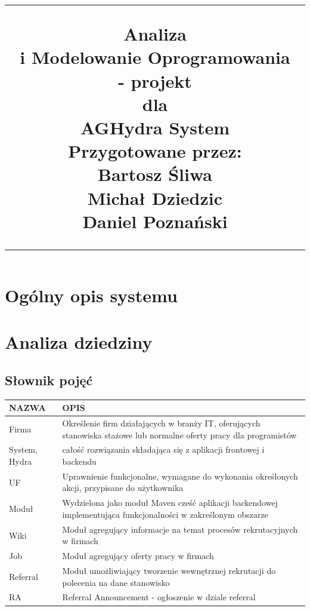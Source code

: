 \documentclass{scrreprt}
\title{%
\flushright
\rule{16cm}{5pt}\vskip1cm
\Huge{Analiza\\ i Modelowanie Oprogramowania \\ - projekt}\\
\vspace{2cm}
dla\\
\vspace{2cm}
AGHydra System\\
\vspace{2cm}
Przygotowane przez:\\
Bartosz Śliwa\\
Michał Dziedzic\\
Daniel Poznański\\
\vfill
\rule{16cm}{5pt}
}
\date{}
\begin{document}
\maketitle
\tableofcontents
\chapter{Ogólny opis systemu}

\chapter{Analiza dziedziny}

\section{Słownik pojęć}
\begin{table}[ht]
	\centering
	\begin{tabular}{p{4cm}p{8cm}}
		\textbf{NAZWA}                     & \textbf{OPIS}                                                                                                       \\ \hline
		\multicolumn{1}{l|}{Firma}         & Określenie firm działających w branży IT, oferujących stanowiska stażowe lub normalne oferty pracy dla programistów \\ \hline
		\multicolumn{1}{l|}{System, Hydra} & całość rozwiązania składająca się z aplikacji frontowej i backendu                                                  \\ \hline
		\multicolumn{1}{l|}{UF}            & Uprawnienie funkcjonalne, wymagane do wykonania określonych akcji, przypisane do użytkownika                        \\ \hline
		\multicolumn{1}{l|}{Moduł}         & Wydzielona jako moduł Maven cześć aplikacji backendowej implementująca funkcjonalności w zakreślonym obszarze       \\ \hline
		\multicolumn{1}{l|}{Wiki}          & Moduł agregujący informacje na temat procesów rekrutacyjnych w firmach                                              \\ \hline
		\multicolumn{1}{l|}{Job}           & Moduł agregujący oferty pracy w firmach                                                                             \\ \hline
		\multicolumn{1}{l|}{Referral}      & Moduł umożliwiający tworzenie wewnętrznej rekrutacji do polecenia na dane stanowisko                                \\ \hline
		\multicolumn{1}{l|}{RA}            & Referral Announcement - ogłoszenie w dziale referral                                                                \\ \hline
	\end{tabular}
\end{table}
\end{document}
